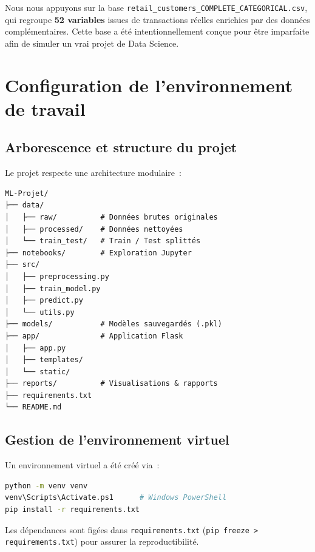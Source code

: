 \documentclass[12pt, a4paper]{article}
\newcommand{\code}[1]{\texttt{\small#1}}
\begin{document}
Nous nous appuyons sur la base \code{retail\_customers\_COMPLETE\_CATEGORICAL.csv},
qui regroupe \textbf{52 variables} issues de transactions réelles enrichies par des
données complémentaires. Cette base a été intentionnellement conçue pour être imparfaite
afin de simuler un vrai projet de Data Science.

\section{Configuration de l'environnement de travail}

\subsection{Arborescence et structure du projet}

Le projet respecte une architecture modulaire~:

\begin{codebox}
\begin{verbatim}
ML-Projet/
├── data/
│   ├── raw/          # Données brutes originales
│   ├── processed/    # Données nettoyées
│   └── train_test/   # Train / Test splittés
├── notebooks/        # Exploration Jupyter
├── src/
│   ├── preprocessing.py
│   ├── train_model.py
│   ├── predict.py
│   └── utils.py
├── models/           # Modèles sauvegardés (.pkl)
├── app/              # Application Flask
│   ├── app.py
│   ├── templates/
│   └── static/
├── reports/          # Visualisations & rapports
├── requirements.txt
└── README.md
\end{verbatim}
\end{codebox}

\subsection{Gestion de l'environnement virtuel}

Un environnement virtuel a été créé via~:

\begin{lstlisting}[language=bash]
python -m venv venv
venv\Scripts\Activate.ps1      # Windows PowerShell
pip install -r requirements.txt
\end{lstlisting}

Les dépendances sont figées dans \code{requirements.txt} (\code{pip freeze > requirements.txt})
pour assurer la reproductibilité.
\end{document}
